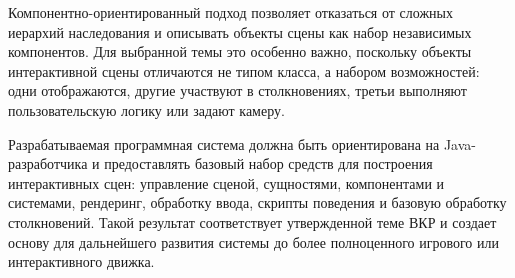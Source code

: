 Компонентно-ориентированный подход позволяет отказаться от сложных
иерархий наследования и описывать объекты сцены как набор независимых
компонентов. Для выбранной темы это особенно важно, поскольку объекты
интерактивной сцены отличаются не типом класса, а набором возможностей:
одни отображаются, другие участвуют в столкновениях, третьи выполняют
пользовательскую логику или задают камеру.

Разрабатываемая программная система должна быть ориентирована на
Java-разработчика и предоставлять базовый набор средств для построения
интерактивных сцен: управление сценой, сущностями, компонентами и
системами, рендеринг, обработку ввода, скрипты поведения и базовую
обработку столкновений. Такой результат соответствует утвержденной теме
ВКР и создает основу для дальнейшего развития системы до более
полноценного игрового или интерактивного движка.
